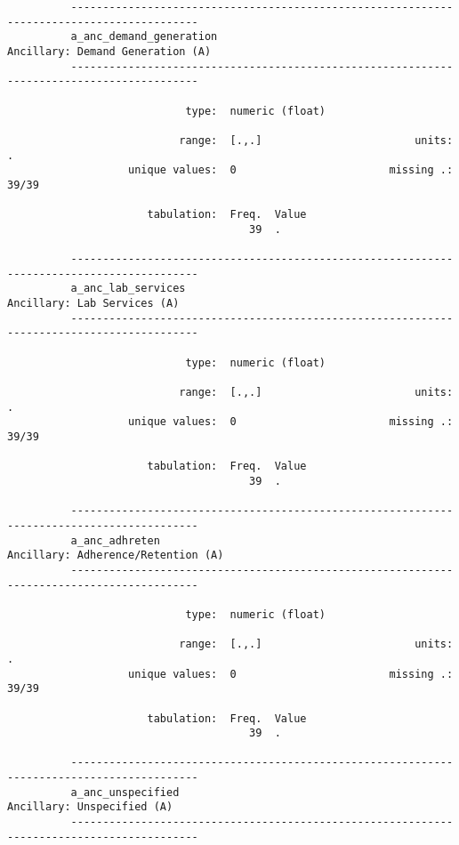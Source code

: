 \documentclass{article}
\begin{document}
\begin{verbatim}
          ------------------------------------------------------------------------------------------
          a_anc_demand_generation                                   Ancillary: Demand Generation (A)
          ------------------------------------------------------------------------------------------
          
                            type:  numeric (float)
          
                           range:  [.,.]                        units:  .
                   unique values:  0                        missing .:  39/39
          
                      tabulation:  Freq.  Value
                                      39  .
          
          ------------------------------------------------------------------------------------------
          a_anc_lab_services                                             Ancillary: Lab Services (A)
          ------------------------------------------------------------------------------------------
          
                            type:  numeric (float)
          
                           range:  [.,.]                        units:  .
                   unique values:  0                        missing .:  39/39
          
                      tabulation:  Freq.  Value
                                      39  .
          
          ------------------------------------------------------------------------------------------
          a_anc_adhreten                                          Ancillary: Adherence/Retention (A)
          ------------------------------------------------------------------------------------------
          
                            type:  numeric (float)
          
                           range:  [.,.]                        units:  .
                   unique values:  0                        missing .:  39/39
          
                      tabulation:  Freq.  Value
                                      39  .
          
          ------------------------------------------------------------------------------------------
          a_anc_unspecified                                               Ancillary: Unspecified (A)
          ------------------------------------------------------------------------------------------
          

\end{verbatim}
\end{document}
